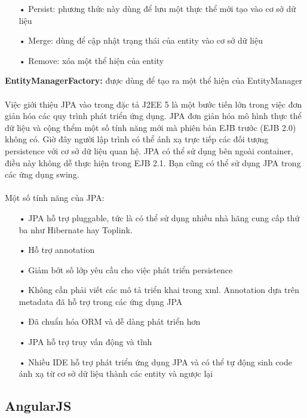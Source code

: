 \documentclass[a4paper]{article}
\begin{document}
\begin{itemize}
	\item[•]Persist: phương thức này dùng để lưu một thực thể mới tạo vào cơ sở dữ liệu
	\item[•]Merge: dùng để cập nhật trạng thái của entity vào cơ sở dữ liệu
	\item[•]Remove: xóa một thể hiện của entity
\end{itemize}
\textbf{EntityManagerFactory: }được dùng để tạo ra một thể hiện của EntityManager\\
\\
Việc giới thiệu JPA vào trong đặc tả J2EE 5 là một bước tiến lớn trong việc đơn giản hóa các quy trình phát triển ứng dụng. JPA đơn giản hóa mô hình thực thể dữ liệu và cộng thểm một số tính năng mới mà phiên bản EJB trước (EJB 2.0) không có. Giờ đây người lập trình có thể ánh xạ trực tiếp các đối tượng persistence với cơ sở dữ liệu quan hệ. JPA có thể sử dụng bên ngoài container, điều này không dễ thực hiện trong EJB 2.1. Bạn cũng có thể sử dụng JPA trong các ứng dụng swing.\\
\\
Một số tính năng của JPA:
\begin{itemize}
	\item[•]JPA hỗ trợ pluggable, tức là có thể sử dụng nhiều nhà hãng cung cấp thứ ba như Hibernate hay Toplink.
	\item[•]Hỗ trợ annotation
	\item[•]Giảm bớt số lớp yêu cầu cho việc phát triển persistence
	\item[•]Không cần phải viết các mô tả triển khai trong xml. Annotation dựa trên metadata đã hỗ trợ trong các ứng dụng JPA
	\item[•]Đã chuẩn hóa ORM và dễ dàng phát triển hơn
	\item[•]JPA hỗ trợ truy vấn động và tĩnh
	\item[•]Nhiều IDE hỗ trợ phát triển ứng dụng JPA và có thể tự động sinh code ánh xạ từ cơ sở dữ liệu thành các entity và ngược lại
\end{itemize}
\subsection{AngularJS}
\end{document}
